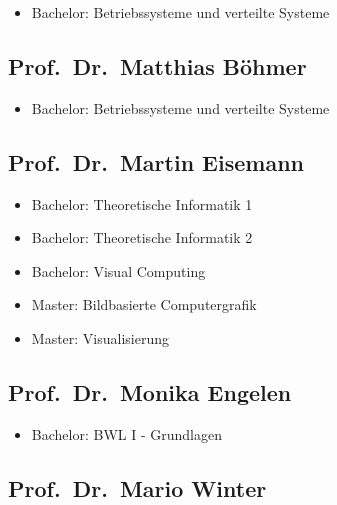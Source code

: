 \begin{itemize}
\tightlist
\item
  Bachelor: Betriebssysteme und verteilte Systeme
\end{itemize}

\subsection{Prof.~Dr.~Matthias
Böhmer\label{/mi-2017/selbstbericht/0800-ausstattung/0000-ausstattung}}\label{prof.dr.matthias-buxf6hmerpathlabelmi-2017selbstbericht0800-ausstattung0000-ausstattung}

\begin{itemize}
\tightlist
\item
  Bachelor: Betriebssysteme und verteilte Systeme
\end{itemize}

\subsection{Prof.~Dr.~Martin
Eisemann\label{/mi-2017/selbstbericht/0800-ausstattung/0000-ausstattung}}\label{prof.dr.martin-eisemannpathlabelmi-2017selbstbericht0800-ausstattung0000-ausstattung}

\begin{itemize}
\tightlist
\item
  Bachelor: Theoretische Informatik 1
\item
  Bachelor: Theoretische Informatik 2
\item
  Bachelor: Visual Computing
\item
  Master: Bildbasierte Computergrafik
\item
  Master: Visualisierung
\end{itemize}

\subsection{Prof.~Dr.~Monika
Engelen\label{/mi-2017/selbstbericht/0800-ausstattung/0000-ausstattung}}\label{prof.dr.monika-engelenpathlabelmi-2017selbstbericht0800-ausstattung0000-ausstattung}

\begin{itemize}
\tightlist
\item
  Bachelor: BWL I - Grundlagen
\end{itemize}

\subsection{Prof.~Dr.~Mario
Winter\label{/mi-2017/selbstbericht/0800-ausstattung/0000-ausstattung}}\label{prof.dr.mario-winterpathlabelmi-2017selbstbericht0800-ausstattung0000-ausstattung}

